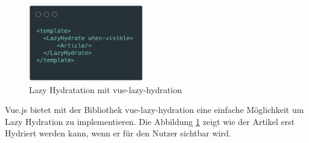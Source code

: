 \documentclass[runningheads]{llncs}
\begin{document}
\begin{figure}[h]
  \centering
  \includegraphics[width=5cm]{images/LazyHydration}
  \caption{Lazy Hydratation mit vue-lazy-hydration}
  \label{Lazy Hydratation mit vue-lazy-hydration}
\end{figure}

Vue.js bietet mit der Bibliothek vue-lazy-hydration 
eine einfache Möglichkeit um Lazy Hydration zu implementieren. 
Die Abbildung \ref{Lazy Hydratation mit vue-lazy-hydration} zeigt wie der Artikel erst Hydriert werden kann, 
wenn er für den Nutzer sichtbar wird.
\end{document}

